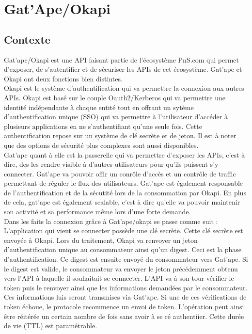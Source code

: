\section{Gat'Ape/Okapi}

\subsection{Contexte}
Gat'ape/Okapi est une API faisant partie de l'écosystème PnS.com qui permet d'exposer, de s'autentifier et de sécuriser les APIs de cet écosystème. Gat'ape et Okapi ont deux fonctions bien distintes.\\

Okapi est le système d'authentification qui va permettre la connexion aux autres APIs. Okapi est basé sur le couple Oauth2/Kerberos qui va permettre une identité indépendante à chaque entité tout en offrant un sytème d'authentification unique (SSO) qui va permettre à l'utilisateur d'accéder à plusieurs applications en ne s'authentifiant qu'une seule fois. Cette authentification repose sur un système de clé secrète et de jeton. Il est à noter que des options de sécurité plus complexes sont aussi disponibles.\\

Gat'ape quant à elle est la passerelle qui va permettre d'exposer les APIs, c'est à dire, des les rendre visible à d'autres utilisateurs pour qu'ils puissent s'y connecter. Gat'ape va pouvoir offir un conrôle d'accès et un contrôle de traffic permettant de réguler le flux des utilisateurs. Gat'ape est également responsable  de l'authentification et de la sécutité lors de la consommation par Okapi. En plus de cela, gat'ape est également scalable, c'est à dire qu'elle va pouvoir maintenir son activité et sa performance même lors d'une forte demande.\\

Dans les faits la connexion grâce à Gat'ape/okapi se passe comme suit : 
L'application qui vient se connecter possède une clé secrète. Cette clé secrète est envoyée à Okapi. Lors du traitement, Okapi va renvoyer un jeton d'authentification unique au consommateur ainsi qu'un digest. Ceci est la phase d'authentification.  Ce digest est ensuite envoyé du consommateur vers Gat'ape. Si le digest est valide, le consommateur va envoyer le jeton précédemment obtenu vers l'API à laquelle il souhaitait se connecter. L'API va à son tour vérifier le token puis le renvoyer ainsi que les informations demandées par le consommateur. Ces informations luis seront transmises via Gat'ape. Si une de ces vérifications de token échoue, le protocole recommence un envoi de token. L'opération peut ainsi être réitérée un certain nombre de fois sans avoir à se ré authentiier. Cette durée de vie (TTL) est paramétrable.


